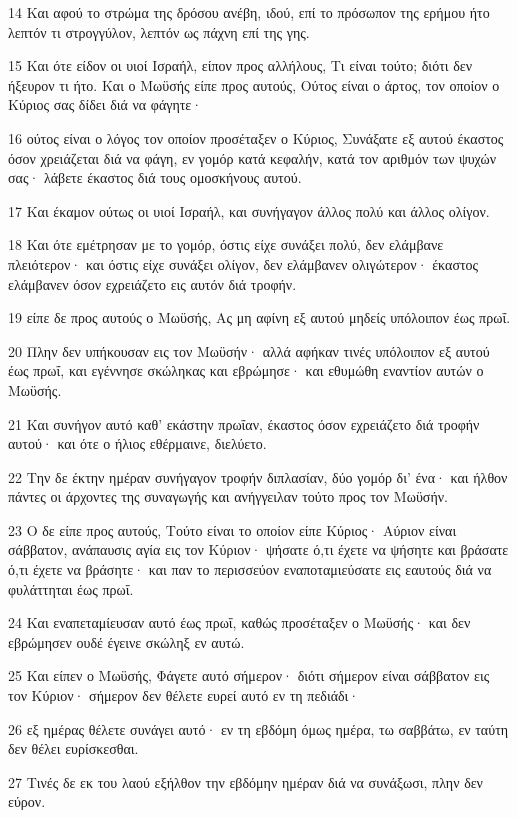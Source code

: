 \par 14 Και αφού το στρώμα της δρόσου ανέβη, ιδού, επί το πρόσωπον της ερήμου ήτο λεπτόν τι στρογγύλον, λεπτόν ως πάχνη επί της γης.
\par 15 Και ότε είδον οι υιοί Ισραήλ, είπον προς αλλήλους, Τι είναι τούτο; διότι δεν ήξευρον τι ήτο. Και ο Μωϋσής είπε προς αυτούς, Ούτος είναι ο άρτος, τον οποίον ο Κύριος σας δίδει διά να φάγητε·
\par 16 ούτος είναι ο λόγος τον οποίον προσέταξεν ο Κύριος, Συνάξατε εξ αυτού έκαστος όσον χρειάζεται διά να φάγη, εν γομόρ κατά κεφαλήν, κατά τον αριθμόν των ψυχών σας· λάβετε έκαστος διά τους ομοσκήνους αυτού.
\par 17 Και έκαμον ούτως οι υιοί Ισραήλ, και συνήγαγον άλλος πολύ και άλλος ολίγον.
\par 18 Και ότε εμέτρησαν με το γομόρ, όστις είχε συνάξει πολύ, δεν ελάμβανε πλειότερον· και όστις είχε συνάξει ολίγον, δεν ελάμβανεν ολιγώτερον· έκαστος ελάμβανεν όσον εχρειάζετο εις αυτόν διά τροφήν.
\par 19 είπε δε προς αυτούς ο Μωϋσής, Ας μη αφίνη εξ αυτού μηδείς υπόλοιπον έως πρωΐ.
\par 20 Πλην δεν υπήκουσαν εις τον Μωϋσήν· αλλά αφήκαν τινές υπόλοιπον εξ αυτού έως πρωΐ, και εγέννησε σκώληκας και εβρώμησε· και εθυμώθη εναντίον αυτών ο Μωϋσής.
\par 21 Και συνήγον αυτό καθ' εκάστην πρωΐαν, έκαστος όσον εχρειάζετο διά τροφήν αυτού· και ότε ο ήλιος εθέρμαινε, διελύετο.
\par 22 Την δε έκτην ημέραν συνήγαγον τροφήν διπλασίαν, δύο γομόρ δι' ένα· και ήλθον πάντες οι άρχοντες της συναγωγής και ανήγγειλαν τούτο προς τον Μωϋσήν.
\par 23 Ο δε είπε προς αυτούς, Τούτο είναι το οποίον είπε Κύριος· Αύριον είναι σάββατον, ανάπαυσις αγία εις τον Κύριον· ψήσατε ό,τι έχετε να ψήσητε και βράσατε ό,τι έχετε να βράσητε· και παν το περισσεύον εναποταμιεύσατε εις εαυτούς διά να φυλάττηται έως πρωΐ.
\par 24 Και εναπεταμίευσαν αυτό έως πρωΐ, καθώς προσέταξεν ο Μωϋσής· και δεν εβρώμησεν ουδέ έγεινε σκώληξ εν αυτώ.
\par 25 Και είπεν ο Μωϋσής, Φάγετε αυτό σήμερον· διότι σήμερον είναι σάββατον εις τον Κύριον· σήμερον δεν θέλετε ευρεί αυτό εν τη πεδιάδι·
\par 26 εξ ημέρας θέλετε συνάγει αυτό· εν τη εβδόμη όμως ημέρα, τω σαββάτω, εν ταύτη δεν θέλει ευρίσκεσθαι.
\par 27 Τινές δε εκ του λαού εξήλθον την εβδόμην ημέραν διά να συνάξωσι, πλην δεν εύρον.
